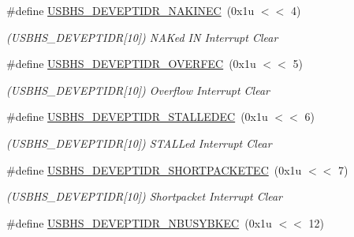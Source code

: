 \begin{DoxyCompactItemize}
\#define \mbox{\hyperlink{group__SAME70__USBHS_ga421f5227963f7f012335278589732375}{U\+S\+B\+H\+S\+\_\+\+D\+E\+V\+E\+P\+T\+I\+D\+R\+\_\+\+N\+A\+K\+I\+N\+EC}}~(0x1u $<$$<$ 4)
\begin{DoxyCompactList}\small\item\em (U\+S\+B\+H\+S\+\_\+\+D\+E\+V\+E\+P\+T\+I\+DR\mbox{[}10\mbox{]}) N\+A\+Ked IN Interrupt Clear \end{DoxyCompactList}\item 
\mbox{\label{group__SAME70__USBHS_gabb9709b9f1946dd48901e2a9a7b6ce9f}} 
\#define \mbox{\hyperlink{group__SAME70__USBHS_gabb9709b9f1946dd48901e2a9a7b6ce9f}{U\+S\+B\+H\+S\+\_\+\+D\+E\+V\+E\+P\+T\+I\+D\+R\+\_\+\+O\+V\+E\+R\+F\+EC}}~(0x1u $<$$<$ 5)
\begin{DoxyCompactList}\small\item\em (U\+S\+B\+H\+S\+\_\+\+D\+E\+V\+E\+P\+T\+I\+DR\mbox{[}10\mbox{]}) Overflow Interrupt Clear \end{DoxyCompactList}\item 
\mbox{\label{group__SAME70__USBHS_ga5cea648181f2c3156e6032c654e37c3f}} 
\#define \mbox{\hyperlink{group__SAME70__USBHS_ga5cea648181f2c3156e6032c654e37c3f}{U\+S\+B\+H\+S\+\_\+\+D\+E\+V\+E\+P\+T\+I\+D\+R\+\_\+\+S\+T\+A\+L\+L\+E\+D\+EC}}~(0x1u $<$$<$ 6)
\begin{DoxyCompactList}\small\item\em (U\+S\+B\+H\+S\+\_\+\+D\+E\+V\+E\+P\+T\+I\+DR\mbox{[}10\mbox{]}) S\+T\+A\+L\+Led Interrupt Clear \end{DoxyCompactList}\item 
\mbox{\label{group__SAME70__USBHS_ga96d9c09a63e83aaddcd44de4b3bf5850}} 
\#define \mbox{\hyperlink{group__SAME70__USBHS_ga96d9c09a63e83aaddcd44de4b3bf5850}{U\+S\+B\+H\+S\+\_\+\+D\+E\+V\+E\+P\+T\+I\+D\+R\+\_\+\+S\+H\+O\+R\+T\+P\+A\+C\+K\+E\+T\+EC}}~(0x1u $<$$<$ 7)
\begin{DoxyCompactList}\small\item\em (U\+S\+B\+H\+S\+\_\+\+D\+E\+V\+E\+P\+T\+I\+DR\mbox{[}10\mbox{]}) Shortpacket Interrupt Clear \end{DoxyCompactList}\item 
\mbox{\label{group__SAME70__USBHS_ga4e2f76ccd5459ef8b5cfb351aced0739}} 
\#define \mbox{\hyperlink{group__SAME70__USBHS_ga4e2f76ccd5459ef8b5cfb351aced0739}{U\+S\+B\+H\+S\+\_\+\+D\+E\+V\+E\+P\+T\+I\+D\+R\+\_\+\+N\+B\+U\+S\+Y\+B\+K\+EC}}~(0x1u $<$$<$ 12)
$$
\end{DoxyCompactItemize}
